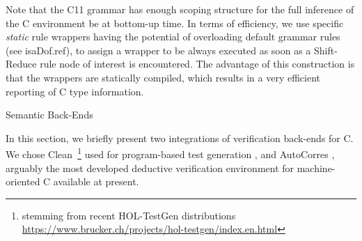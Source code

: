 \begin{isabellebody}
\begin{isamarkuptext}
Note that the C11 grammar has enough scoping structure for the full inference of the C environment
 be at bottom-up time. In terms of efficiency, we use specific
\emph{static} rule wrappers having the potential of overloading default grammar rules (see \csname isaDof.ref), to assign a wrapper to be always executed as soon as a Shift-Reduce
rule node of interest is encountered. The advantage of this construction is that the wrappers are
statically compiled, which results in a very efficient reporting of C type information.%
\end{isamarkuptext}\isamarkuptrue%
%
\begin{isamarkupsection*}%
[label = {backends},type = {scholarly_paper.technical}, args={label = {backends},type = {scholarly_paper.technical}, scholarly_paper.text_section.main_author = {@{docitem ''bu''}}, Isa_COL.text_element.level = {}, Isa_COL.text_element.referentiable = {False}, Isa_COL.text_element.variants = {{STR ''outline'', STR ''document''}}, scholarly_paper.text_section.fixme_list = {}, Isa_COL.text_element.level = {}, scholarly_paper.technical.definition_list = {}}]Semantic Back-Ends%
\end{isamarkupsection*}\isamarkuptrue%
%
\begin{isamarkuptext}%
In this section, we briefly present two integrations of verification back-ends for C. We
chose Clean~\footnote{stemming from recent HOL-TestGen distributions
    \url{https://www.brucker.ch/projects/hol-testgen/index.en.html}} used
for program-based test generation \cite{DBLP:conf/tap/Keller18}, and AutoCorres \cite{DBLP:conf/pldi/GreenawayLAK14}, arguably the most developed deductive verification environment
for machine-oriented C available at present.


\end{isamarkuptext}
\end{isabellebody}
